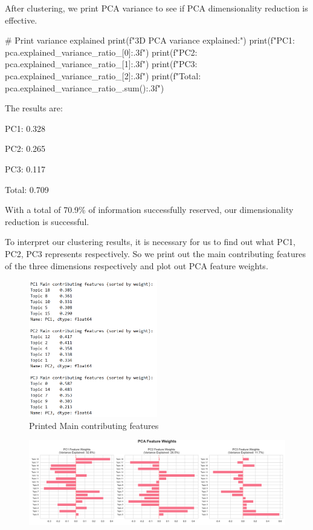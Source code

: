 \documentclass[12pt]{article}
\begin{document}
	After clustering, we print PCA variance to see if PCA dimensionality reduction is effective.
	\begin{python}
# Print variance explained
print(f"3D PCA variance explained:")
print(f"PC1: {pca.explained_variance_ratio_[0]:.3f}")
print(f"PC2: {pca.explained_variance_ratio_[1]:.3f}")  
print(f"PC3: {pca.explained_variance_ratio_[2]:.3f}")
print(f"Total: {pca.explained_variance_ratio_.sum():.3f}")
	\end{python}
	
	The results are:
	
	PC1: 0.328
	
	PC2: 0.265
	
	PC3: 0.117
	
	Total: 0.709
	
	With a total of 70.9\% of information successfully reserved, our dimensionality reduction is successful.
	
	To interpret our clustering results, it is necessary for us to find out what PC1, PC2, PC3 represents respectively. So we print out the main contributing features of the three dimensions respectively and plot out PCA feature weights.
	\begin{figure}[H]
		\centering
		\includegraphics[width=0.5\textwidth]{Q2PCA1} 
		\caption{\centering Printed Main contributing features}		
	\end{figure}	
	\begin{figure}[H]
			\centering
			\includegraphics[width=1\textwidth]{Q2PCA2} 		
	\end{figure}
	
\end{document}
